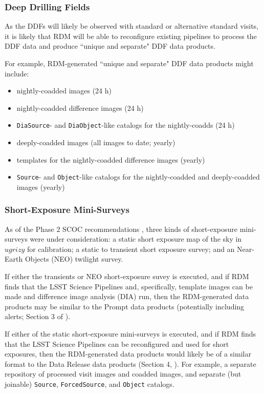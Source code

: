 \subsubsection{Deep Drilling Fields}

As the DDFs will likely be observed with standard or alternative standard 
visits, it is likely that RDM will be able to reconfigure existing pipelines 
to process the DDF data and produce ``unique and separate" DDF data products.

For example, RDM-generated ``unique and separate" DDF data products might 
include:
\begin{itemize}
\item nightly-coadded images (24 h)
\item nightly-coadded difference images (24 h)
\item {\tt DiaSource}- and {\tt DiaObject}-like catalogs for the nightly-coadds (24 h)
\item deeply-coadded images (all images to date; yearly)
\item templates for the nightly-coadded difference images (yearly)
\item {\tt Source}- and {\tt Object}-like catalogs for the nightly-coadded and deeply-coadded images (yearly)
\end{itemize}


\subsubsection{Short-Exposure Mini-Surveys}

As of the Phase 2 SCOC recommendations , three kinds of 
short-exposure mini-surveys were under consideration: 
a static short exposure map of the sky in $ugrizy$ for calibration; 
a static to transient short exposure survey; and 
an Near-Earth Objects (NEO) twilight survey.

If either the transients or NEO short-exposure suvey is executed, and if 
RDM finds that the LSST Science Pipelines and, specifically, template images 
can be made and difference image analysis (DIA) run, then the RDM-generated 
data products may be similar to the Prompt data products (potentially 
including alerts; Section 3 of ).

If either of the static short-exposure mini-surveys is executed, and if 
RDM finds that the LSST Science Pipelines can be reconfigured and used 
for short exposures, then the RDM-generated data products would likely be 
of a similar format to the Data Release data products 
(Section 4, ).
For example, a separate repository of processed visit images and coadded 
images, and separate (but joinable) {\tt Source}, {\tt ForcedSource}, and 
{\tt Object} catalogs.


